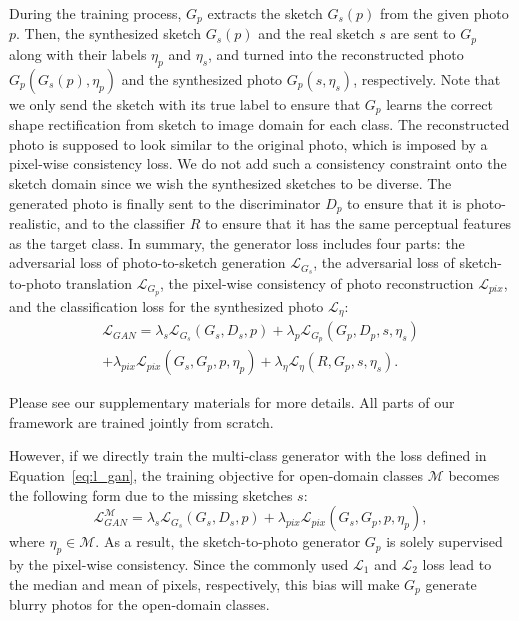 \documentclass[10pt,twocolumn,letterpaper]{article}
\begin{document}
During the training process, $G_{p}$ extracts the sketch $G_{s}(p)$ from the given photo $p$. Then, the synthesized sketch $G_{s}(p)$ and the real sketch $s$ are sent to $G_{p}$ along with their labels $\eta_p$ and $\eta_s$, and turned into the reconstructed photo $G_{p}(G_{s}(p), \eta_p)$ and the synthesized photo $G_{p}(s, \eta_s)$, respectively. Note that we only send the sketch with its true label to ensure that $G_{p}$ learns the correct shape rectification from sketch to image domain for each class. The reconstructed photo is supposed to look similar to the original photo, which is imposed by a pixel-wise consistency loss. We do not add such a consistency constraint onto the sketch domain since we wish the synthesized sketches to be diverse. The generated photo is finally sent to the discriminator $D_p$ to ensure that it is photo-realistic, and to the classifier $R$ to ensure that it has the same perceptual features as the target class. In summary, the generator loss includes four parts: the adversarial loss of photo-to-sketch generation $\mathcal{L}_{G_{s}}$, the adversarial loss of sketch-to-photo translation $\mathcal{L}_{G_{p}}$, the pixel-wise consistency of photo reconstruction $\mathcal{L}_{pix}$, and the classification loss for the synthesized photo $\mathcal{L}_{\eta}$:\begin{multline}
\label{eq:l_gan}
    \mathcal{L}_{GAN} = \lambda_s\mathcal{L}_{G_{s}}(G_{s}, D_s, p) + \lambda_p\mathcal{L}_{G_{p}}(G_{p},D_p,s,\eta_s) \\ + \lambda_{pix}\mathcal{L}_{pix}(G_{s},G_{p},p,\eta_p) + \lambda_{\eta}\mathcal{L}_{\eta}(R,G_{p},s,\eta_s).
\end{multline}

Please see our supplementary materials for more details. All parts of our framework are trained jointly from scratch. 

However, if we directly train the multi-class generator with the loss defined in Equation~\ref{eq:l_gan}, the training objective for open-domain classes $\mathcal{M}$ becomes the following form due to the missing sketches $s$:  
\begin{equation}
\label{eq:lgan_regress}
    \mathcal{L}_{GAN}^{\mathcal{M}} = \lambda_s\mathcal{L}_{G_{s}}(G_{s}, D_s, p) + \lambda_{pix}\mathcal{L}_{pix}(G_{s}, G_{p}, p, \eta_p),
\end{equation}
where $\eta_p \in \mathcal{M}$. As a result, the sketch-to-photo generator $G_{p}$ is solely supervised by the pixel-wise consistency. Since the commonly used $\mathcal{L}_1$ and $\mathcal{L}_2$ loss lead to the median and mean of pixels, respectively, this bias will make $G_{p}$ generate blurry photos for the open-domain classes.  
\end{document}

